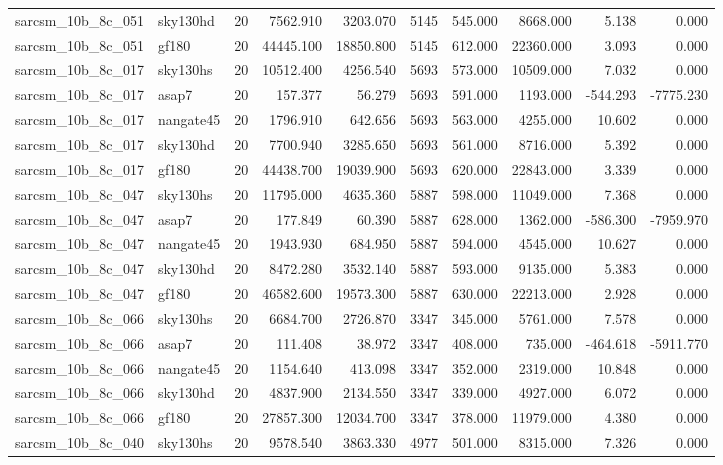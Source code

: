 \documentclass{article}
\begin{document}
\begin{longtable}{llrrrrrrrr}
sarcsm\_10b\_8c\_051 & sky130hd & 20 & 7562.910 & 3203.070 & 5145 & 545.000 & 8668.000 & 5.138 & 0.000 \\
sarcsm\_10b\_8c\_051 & gf180 & 20 & 44445.100 & 18850.800 & 5145 & 612.000 & 22360.000 & 3.093 & 0.000 \\
sarcsm\_10b\_8c\_017 & sky130hs & 20 & 10512.400 & 4256.540 & 5693 & 573.000 & 10509.000 & 7.032 & 0.000 \\
sarcsm\_10b\_8c\_017 & asap7 & 20 & 157.377 & 56.279 & 5693 & 591.000 & 1193.000 & -544.293 & -7775.230 \\
sarcsm\_10b\_8c\_017 & nangate45 & 20 & 1796.910 & 642.656 & 5693 & 563.000 & 4255.000 & 10.602 & 0.000 \\
sarcsm\_10b\_8c\_017 & sky130hd & 20 & 7700.940 & 3285.650 & 5693 & 561.000 & 8716.000 & 5.392 & 0.000 \\
sarcsm\_10b\_8c\_017 & gf180 & 20 & 44438.700 & 19039.900 & 5693 & 620.000 & 22843.000 & 3.339 & 0.000 \\
sarcsm\_10b\_8c\_047 & sky130hs & 20 & 11795.000 & 4635.360 & 5887 & 598.000 & 11049.000 & 7.368 & 0.000 \\
sarcsm\_10b\_8c\_047 & asap7 & 20 & 177.849 & 60.390 & 5887 & 628.000 & 1362.000 & -586.300 & -7959.970 \\
sarcsm\_10b\_8c\_047 & nangate45 & 20 & 1943.930 & 684.950 & 5887 & 594.000 & 4545.000 & 10.627 & 0.000 \\
sarcsm\_10b\_8c\_047 & sky130hd & 20 & 8472.280 & 3532.140 & 5887 & 593.000 & 9135.000 & 5.383 & 0.000 \\
sarcsm\_10b\_8c\_047 & gf180 & 20 & 46582.600 & 19573.300 & 5887 & 630.000 & 22213.000 & 2.928 & 0.000 \\
sarcsm\_10b\_8c\_066 & sky130hs & 20 & 6684.700 & 2726.870 & 3347 & 345.000 & 5761.000 & 7.578 & 0.000 \\
sarcsm\_10b\_8c\_066 & asap7 & 20 & 111.408 & 38.972 & 3347 & 408.000 & 735.000 & -464.618 & -5911.770 \\
sarcsm\_10b\_8c\_066 & nangate45 & 20 & 1154.640 & 413.098 & 3347 & 352.000 & 2319.000 & 10.848 & 0.000 \\
sarcsm\_10b\_8c\_066 & sky130hd & 20 & 4837.900 & 2134.550 & 3347 & 339.000 & 4927.000 & 6.072 & 0.000 \\
sarcsm\_10b\_8c\_066 & gf180 & 20 & 27857.300 & 12034.700 & 3347 & 378.000 & 11979.000 & 4.380 & 0.000 \\
sarcsm\_10b\_8c\_040 & sky130hs & 20 & 9578.540 & 3863.330 & 4977 & 501.000 & 8315.000 & 7.326 & 0.000 \\

\end{longtable}
\end{document}
